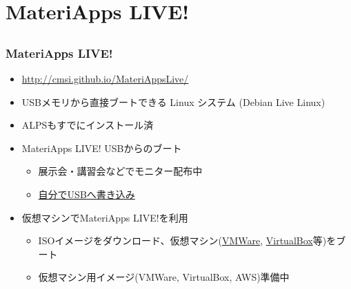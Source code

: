 \section{MateriApps LIVE!}
\subsection*{\redm\whiteb\greenb}

\begin{frame}
 \frametitle{MateriApps LIVE!}
 \begin{itemize}
   \item \url{http://cmsi.github.io/MateriAppsLive/}
   \item USBメモリから直接ブートできる Linux システム (Debian Live Linux)
   \item ALPSもすでにインストール済
   \item MateriApps LIVE! USBからのブート
     \begin{itemize}
     \item 展示会・講習会などでモニター配布中
     \item \href{https://github.com/cmsi/MateriAppsLive/wiki/HowToMakeLiveUSB}{自分でUSBへ書き込み}
     \end{itemize}
   \item 仮想マシンでMateriApps LIVE!を利用
     \begin{itemize}
     \item ISOイメージをダウンロード、仮想マシン(\href{https://github.com/cmsi/MateriAppsLive/wiki/Using-MateriApps-LIVE!-by-VMWare}{VMWare}, \href{https://github.com/cmsi/MateriAppsLive/wiki/KnownProblems}{VirtualBox}等)をブート
     \item 仮想マシン用イメージ(VMWare, VirtualBox, AWS)準備中
     \end{itemize}
 \end{itemize}
\end{frame}


